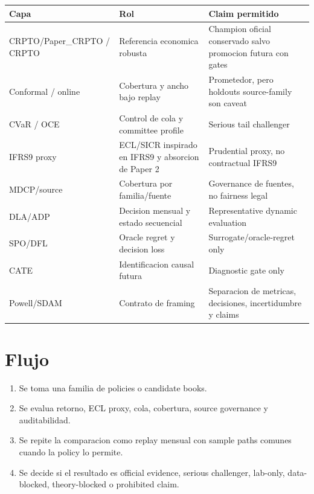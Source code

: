 \documentclass[
  spanish,
  11pt,
  letterpaper,
]{scrbook}
\newcounter{none} %
\providecommand{\tightlist}{%
  \setlength{\itemsep}{0pt}\setlength{\parskip}{0pt}}
\theoremstyle{plain}
\theoremstyle{remark}
\begin{document}
{\def\LTcaptype{none} %
\begin{longtable}[]{@{}
  >{\raggedright\arraybackslash}p{}
  >{\raggedright\arraybackslash}p{}
  >{\raggedright\arraybackslash}p{}@{}}
\toprule\noalign{}
\begin{minipage}[b]{\linewidth}\raggedright
Capa
\end{minipage} & \begin{minipage}[b]{\linewidth}\raggedright
Rol
\end{minipage} & \begin{minipage}[b]{\linewidth}\raggedright
Claim permitido
\end{minipage} \\
\midrule\noalign{}
\endhead
\bottomrule\noalign{}
\endlastfoot
CRPTO/Paper\_CRPTO / CRPTO & Referencia economica robusta & Champion
oficial conservado salvo promocion futura con gates \\
Conformal / online & Cobertura y ancho bajo replay & Prometedor, pero
holdouts source-family son caveat \\
CVaR / OCE & Control de cola y committee profile & Serious tail
challenger \\
IFRS9 proxy & ECL/SICR inspirado en IFRS9 y absorcion de Paper 2 &
Prudential proxy, no contractual IFRS9 \\
MDCP/source & Cobertura por familia/fuente & Governance de fuentes, no
fairness legal \\
DLA/ADP & Decision mensual y estado secuencial & Representative dynamic
evaluation \\
SPO/DFL & Oracle regret y decision loss & Surrogate/oracle-regret
only \\
CATE & Identificacion causal futura & Diagnostic gate only \\
Powell/SDAM & Contrato de framing & Separacion de metricas, decisiones,
incertidumbre y claims \\
\end{longtable}
}

\section{Flujo}\label{flujo}

\begin{enumerate}
\def\labelenumi{\arabic{enumi}.}
\tightlist
\item
  Se toma una familia de policies o candidate books.
\item
  Se evalua retorno, ECL proxy, cola, cobertura, source governance y
  auditabilidad.
\item
  Se repite la comparacion como replay mensual con sample paths comunes
  cuando la policy lo permite.
\item
  Se decide si el resultado es official evidence, serious challenger,
  lab-only, data-blocked, theory-blocked o prohibited claim.
\end{enumerate}
\end{document}
